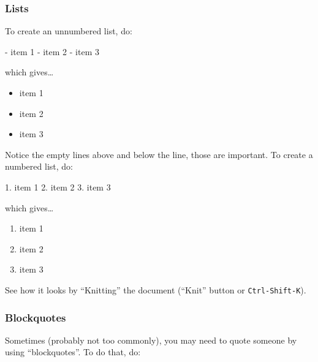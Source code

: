 \documentclass[]{Nemilov}
\newenvironment{Shaded}{\begin{snugshade}}{\end{snugshade}}
\newcommand{\FloatTok}[1]{\textcolor[rgb]{0.00,0.00,0.81}{#1}}
\newcommand{\NormalTok}[1]{#1}
\providecommand{\tightlist}{%
  \setlength{\itemsep}{0pt}\setlength{\parskip}{0pt}}
\begin{document}
\hypertarget{lists}{%
\subsubsection{Lists}\label{lists}}

To create an unnumbered list, do:

\begin{Shaded}
\begin{Highlighting}[]

\NormalTok{- }\FloatTok{item 1}
\FloatTok{- item 2}
\FloatTok{- item 3}
\end{Highlighting}
\end{Shaded}

which gives\ldots{}

\begin{itemize}
\tightlist
\item
  item 1
\item
  item 2
\item
  item 3
\end{itemize}

Notice the empty lines above and below the line, those are important. To create
a numbered list, do:

\begin{Shaded}
\begin{Highlighting}[]

\NormalTok{1. }\FloatTok{item 1}
\FloatTok{2. item 2}
\FloatTok{3. item 3}
\end{Highlighting}
\end{Shaded}

which gives\ldots{}

\begin{enumerate}
\def\labelenumi{\arabic{enumi}.}
\tightlist
\item
  item 1
\item
  item 2
\item
  item 3
\end{enumerate}

See how it looks by ``Knitting'' the document (``Knit'' button or \texttt{Ctrl-Shift-K}).

\hypertarget{blockquotes}{%
\subsubsection{Blockquotes}\label{blockquotes}}

Sometimes (probably not too commonly), you may need to quote someone by using
``blockquotes''. To do that, do:
\end{document}
